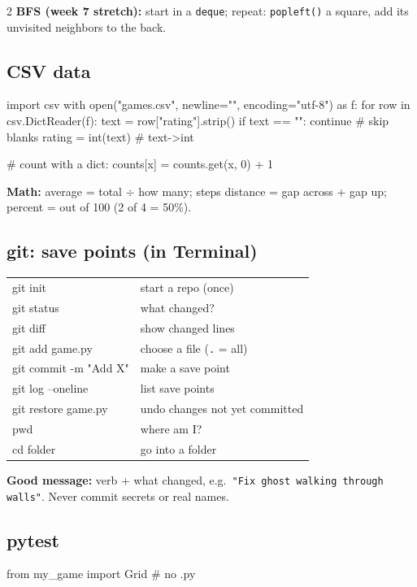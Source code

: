 \documentclass[level=3]{kidscode}
\begin{document}
\begin{multicols}{2}
\textbf{BFS (week 7 stretch):} start in a \texttt{deque}; repeat: \texttt{popleft()} a square,
add its unvisited neighbors to the back.

\subsection{CSV data}
\begin{sheetcode}
import csv
with open("games.csv", newline="",
          encoding="utf-8") as f:
    for row in csv.DictReader(f):
        text = row["rating"].strip()
        if text == "":
            continue      # skip blanks
        rating = int(text)  # text->int

# count with a dict:
counts[x] = counts.get(x, 0) + 1
\end{sheetcode}
\textbf{Math:} average = total $\div$ how many; steps distance = gap across + gap up;
percent = out of 100 (2 of 4 = 50\%).

\subsection{git: save points (in Terminal)}
\renewcommand{\arraystretch}{1.1}
\begin{tabularx}{\linewidth}{@{}>{\ttfamily}l>{\raggedright\arraybackslash}X@{}}
git init & start a repo (once)\\
git status & what changed?\\
git diff & show changed lines\\
git add game.py & choose a file (\texttt{.} = all)\\
git commit -m "Add X" & make a save point\\
git log --oneline & list save points\\
git restore game.py & undo changes not yet committed\\
pwd & where am I?\\
cd folder & go into a folder\\
\end{tabularx}

\textbf{Good message:} verb + what changed, e.g.\ \texttt{"Fix ghost walking through walls"}.
Never commit secrets or real names.

\subsection{pytest}
\begin{sheetcode}
from my_game import Grid  # no .py


\end{sheetcode}
\end{multicols}
\end{document}
